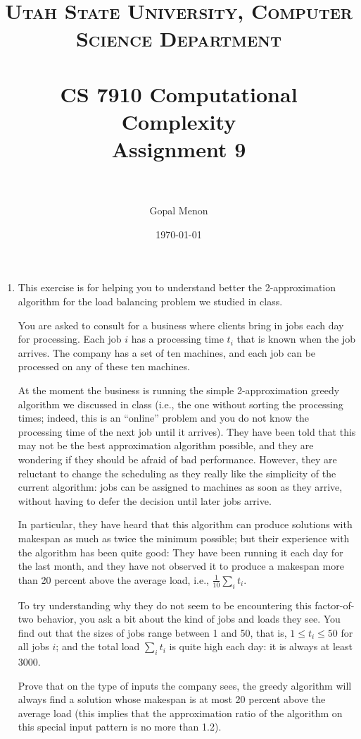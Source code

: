 \documentclass[paper=a4, fontsize=11pt]{scrartcl} %
\title{	
\normalfont \normalsize 
\textsc{Utah State University, Computer Science Department} \\ [25pt] %
\horrule{0.5pt} \\[0.4cm] %
\huge CS 7910 Computational Complexity\\Assignment 9 \\ %
\horrule{2pt} \\[0.5cm] %
}
\author{Gopal Menon} %
\date{\normalsize\today} %
\numberwithin{figure}{section} %
\numberwithin{table}{section} %
\begin{document}
\maketitle %

\begin{enumerate}
\item This exercise is for helping you to understand better the 2-approximation algorithm for the load balancing problem we studied in class.

You are asked to consult for a business where clients bring in jobs each day for processing. Each job $i$ has a processing time $t_i$ that is known when the job arrives. The company has a set of ten machines, and each job can be processed on any of these ten machines.

At the moment the business is running the simple 2-approximation greedy algorithm we discussed in class (i.e., the one without sorting the processing times; indeed, this is an \enquote{online} problem and you do not know the processing time of the next job until it arrives). They have been told that this may not be the best approximation algorithm possible, and they are wondering if they should be afraid of bad performance. However, they are reluctant to change the scheduling as they really like the simplicity of the current algorithm: jobs can be assigned to machines as soon as they arrive, without having to defer the decision until later jobs arrive.

In particular, they have heard that this algorithm can produce solutions with makespan as much as twice the minimum possible; but their experience with the algorithm has been quite good: They have been running it each day for the last month, and they have not observed it to produce a makespan more than 20 percent above the average load, i.e., $\frac{1}{10} \sum_i t_i$.

To try understanding why they do not seem to be encountering this factor-of-two behavior, you ask a bit about the kind of jobs and loads they see. You find out that the sizes of jobs range between 1 and 50, that is, $1 \leq t_i \leq 50$ for all jobs $i$; and the total load $\sum_i t_i$ is quite high each day: it is always at least 3000.

Prove that on the type of inputs the company sees, the greedy algorithm will always find a solution whose makespan is at most 20 percent above the average load (this implies that the approximation ratio of the algorithm on this special input pattern is no more than 1.2).\\


\end{enumerate}
\end{document}
